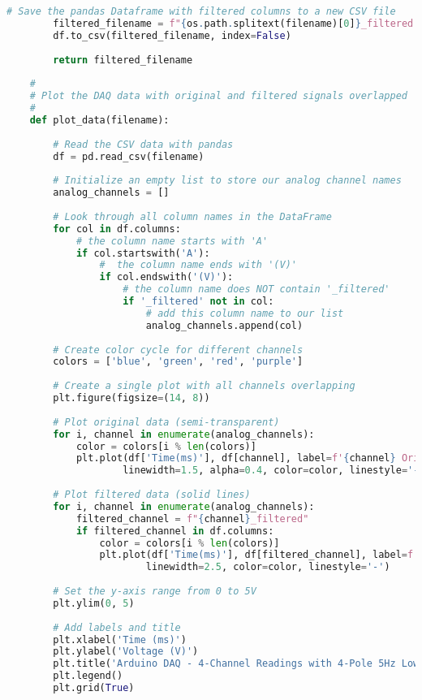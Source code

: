 \begin{lstlisting}[style=pythonstyle, caption=Python Serial Receive Script, label=lst:pythonCodeApp, language=Python ]
        # Save the pandas Dataframe with filtered columns to a new CSV file
        filtered_filename = f"{os.path.splitext(filename)[0]}_filtered.csv"
        df.to_csv(filtered_filename, index=False)
        
        return filtered_filename
    
    #
    # Plot the DAQ data with original and filtered signals overlapped
    #
    def plot_data(filename):
        
        # Read the CSV data with pandas
        df = pd.read_csv(filename)
        
        # Initialize an empty list to store our analog channel names
        analog_channels = []
    
        # Look through all column names in the DataFrame
        for col in df.columns:
            # the column name starts with 'A'
            if col.startswith('A'):
                #  the column name ends with '(V)'
                if col.endswith('(V)'):
                    # the column name does NOT contain '_filtered'
                    if '_filtered' not in col:
                        # add this column name to our list
                        analog_channels.append(col)
        
        # Create color cycle for different channels
        colors = ['blue', 'green', 'red', 'purple']
        
        # Create a single plot with all channels overlapping
        plt.figure(figsize=(14, 8))
        
        # Plot original data (semi-transparent)
        for i, channel in enumerate(analog_channels):
            color = colors[i % len(colors)]
            plt.plot(df['Time(ms)'], df[channel], label=f'{channel} Original', 
                    linewidth=1.5, alpha=0.4, color=color, linestyle='-')
        
        # Plot filtered data (solid lines)
        for i, channel in enumerate(analog_channels):
            filtered_channel = f"{channel}_filtered"
            if filtered_channel in df.columns:
                color = colors[i % len(colors)]
                plt.plot(df['Time(ms)'], df[filtered_channel], label=f'{channel} Filtered', 
                        linewidth=2.5, color=color, linestyle='-')
        
        # Set the y-axis range from 0 to 5V
        plt.ylim(0, 5)
        
        # Add labels and title
        plt.xlabel('Time (ms)')
        plt.ylabel('Voltage (V)')
        plt.title('Arduino DAQ - 4-Channel Readings with 4-Pole 5Hz Low-Pass Filter')
        plt.legend()
        plt.grid(True)
            

\end{lstlisting}
